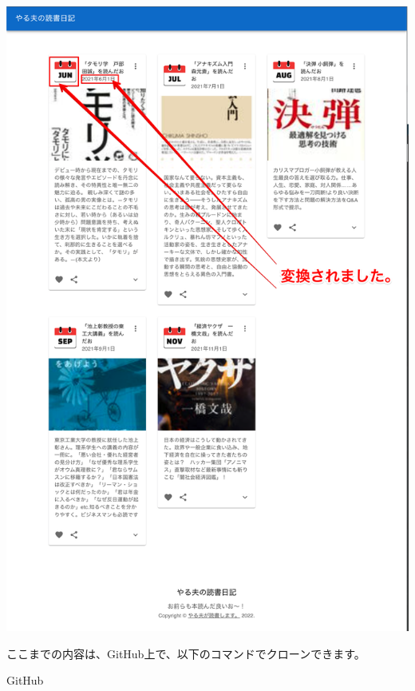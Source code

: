 \begin{reviewimage}%
\includegraphics[width=0.7\maxwidth]{./images/03-todo-with-react/mui015-card-Header-done.png}%
\label{image:03-todo-with-react:mui015-card-Header-done}
\end{reviewimage}
\begin{starternote}[]{}

ここまでの内容は、GitHub上で、以下のコマンドでクローンできます。

\def\startercodeblockfontsize{}
\begin{starterterminal}[]{GitHub}\end{starterterminal}
\end{starternote}

